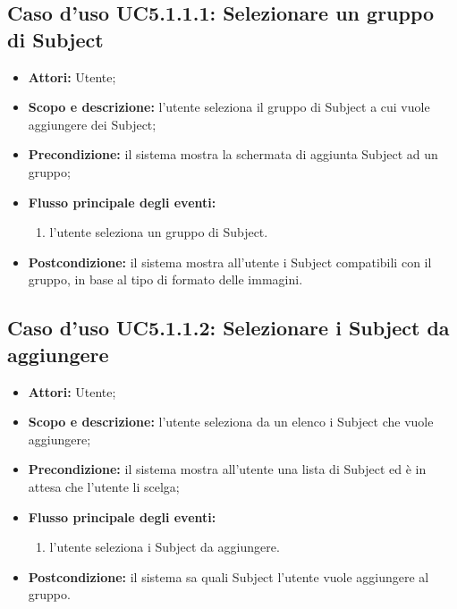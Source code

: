 \subsection{Caso d'uso UC5.1.1.1: Selezionare un gruppo di Subject}
\begin{itemize}
\item \textbf{Attori:} Utente;
\item \textbf{Scopo e descrizione:} l'utente seleziona il gruppo di Subject\glossario{} a cui vuole aggiungere dei Subject\glossario{};
\item \textbf{Precondizione:} il sistema mostra la schermata di aggiunta Subject\glossario{} ad un gruppo;
\item \textbf{Flusso principale degli eventi:}
\begin{enumerate}
\item l'utente seleziona un gruppo di Subject\glossario{}.
\end{enumerate}
\item \textbf{Postcondizione:} il sistema mostra all'utente i Subject\glossario{} compatibili con il gruppo, in base al tipo di formato delle immagini.
\end{itemize}

\subsection{Caso d'uso UC5.1.1.2: Selezionare i Subject da aggiungere}
\begin{itemize}
\item \textbf{Attori:} Utente;
\item \textbf{Scopo e descrizione:} l'utente seleziona da un elenco i Subject\glossario{} che vuole aggiungere;
\item \textbf{Precondizione:} il sistema mostra all'utente una lista di Subject\glossario{} ed è in attesa che l'utente li scelga;
\item \textbf{Flusso principale degli eventi:}
\begin{enumerate}
\item l'utente seleziona i Subject\glossario{} da aggiungere.
\end{enumerate}
\item \textbf{Postcondizione:} il sistema sa quali Subject\glossario{} l'utente vuole aggiungere al gruppo.
\end{itemize}

